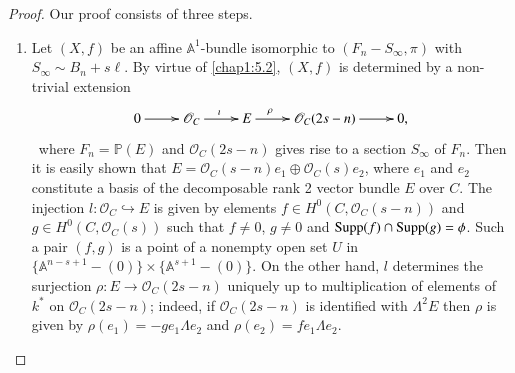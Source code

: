 \begin{proof}
Our proof consists of three steps.
\begin{enumerate}
\renewcommand{\theenumi}{\Roman{enumi}}
\renewcommand{\labelenumi}{(\theenumi)}
\item Let $(X,f)$ be an affine $\mathbb{A}^{1}$-bundle isomorphic to
  $(F_{n}-S_{\infty},\pi)$ with $S_{\infty}\sim B_{n}+s\ell$. By
  virtue of \ref{chap1:5.2}, $(X,f)$ is determined by a non-trivial
  extension
\[
\xymatrix{0\ar[r]& \mathscr{O}_{C} \ar[r]^{\imath} & E \ar[r]^(.3){\rho} &
  \mathscr{O}_{C}(2s-n) \ar[r] & 0,} 
\]\pageoriginale\
where $F_{n}=\mathbb{P}(E)$ and $\mathscr{O}_{C}(2s-n)$ gives rise to
a section $S_{\infty}$ of $F_{n}$. Then it is easily shown that
$E=\mathscr{O}_{C}(s-n)e_{1}\oplus \mathscr{O}_{C}(s)e_{2}$, where
$e_{1}$ and $e_{2}$ constitute a basis of the decomposable rank 2
vector bundle $E$ over $C$. The injection
$l:\mathscr{O}_{C}\hookrightarrow E$ is given by elements $f\in
H^{0}(C,\mathscr{O}_{C}(s-n))$ and $g\in H^{0}(C,\mathscr{O}_{C}(s))$
such that $f\neq 0$, $g\neq 0$ and $\operatorname{Supp}(f)\cap \operatorname{Supp}(g)=\phi$. Such
a pair $(f,g)$ is a point of a nonempty open set $U$ in
$\{\mathbb{A}^{n-s+1}-(0)\}\times\{\mathbb{A}^{s+1}-(0)\}$. On the
other hand, $l$ determines the surjection $\rho:E\to
\mathscr{O}_{C}(2s-n)$ uniquely up to multiplication of elements of
$k^{\ast}$ on $\mathscr{O}_{C}(2s-n)$; indeed, if
$\mathscr{O}_{C}(2s-n)$ is identified with $\Lambda^{2}E$ then $\rho$
is given by $\rho(e_{1})=-ge_{1}\Lambda e_{2}$ and
$\rho(e_{2})=fe_{1}\Lambda e_{2}$.


\end{enumerate}
\end{proof}
